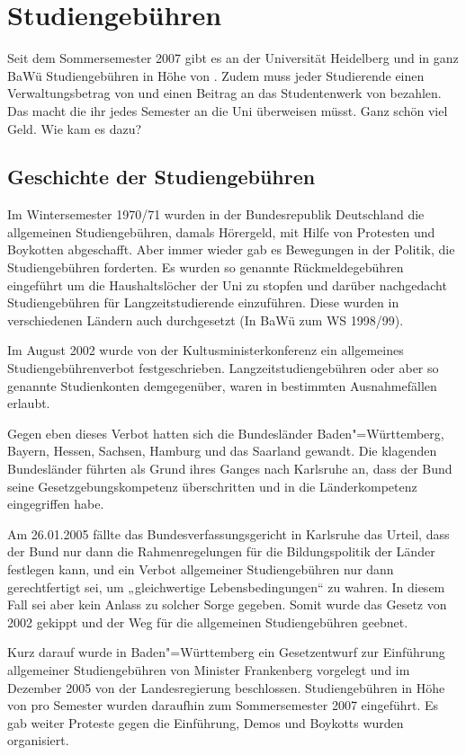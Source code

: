 \section{Studiengebühren}

Seit dem Sommersemester 2007 gibt es an der Universität Heidelberg und in ganz BaWü
Studiengebühren in Höhe von \EUR{\studiengebuehren}. Zudem muss jeder Studierende einen
Verwaltungsbetrag von \EUR{\verwaltungsbetrag} und einen Beitrag an das Studentenwerk von \EUR{\studentenwerksbeitrag}
bezahlen. Das macht \EUR{\beitragssumme} die ihr jedes Semester an die Uni überweisen müsst.
Ganz schön viel Geld. Wie kam es dazu?

\subsection*{Geschichte der Studiengebühren}

Im Wintersemester 1970/71 wurden in der Bundesrepublik Deutschland die allgemeinen
Studiengebühren, damals Hörergeld, mit Hilfe von Protesten und Boykotten abgeschafft.
Aber immer wieder gab es Bewegungen in der Politik, die Studiengebühren forderten.
Es wurden so genannte Rückmeldegebühren eingeführt um die Haushaltslöcher der Uni zu
stopfen und darüber nachgedacht Studiengebühren für Langzeitstudierende einzuführen.
Diese wurden in verschiedenen Ländern auch durchgesetzt (In BaWü zum WS 1998/99).

Im August 2002 wurde von der Kultusministerkonferenz ein allgemeines
Studiengebührenverbot festgeschrieben. Langzeitstudiengebühren oder aber so genannte
Studienkonten demgegenüber, waren in bestimmten Ausnahmefällen erlaubt.

Gegen eben dieses Verbot hatten sich die Bundesländer Baden"=Württemberg, Bayern,
Hessen, Sachsen, Hamburg und das Saarland gewandt. Die klagenden Bundesländer
führten als Grund ihres Ganges nach Karlsruhe an, dass der Bund seine
Gesetzgebungskompetenz überschritten und in die Länderkompetenz eingegriffen habe.

Am 26.01.2005 fällte das Bundesverfassungsgericht in Karlsruhe das Urteil, dass der
Bund nur dann die Rahmenregelungen für die Bildungspolitik der Länder festlegen
kann, und ein Verbot allgemeiner Studiengebühren nur dann gerechtfertigt sei, um
„gleichwertige Lebensbedingungen“ zu wahren. In diesem Fall sei aber
kein Anlass zu solcher Sorge gegeben.  Somit wurde das Gesetz von 2002 gekippt und
der Weg für die allgemeinen Studiengebühren geebnet.

Kurz darauf wurde in Baden"=Württemberg ein Gesetzentwurf zur Einführung allgemeiner
Studiengebühren von Minister Frankenberg vorgelegt und im Dezember 2005 von der
Landesregierung beschlossen.  Studiengebühren in Höhe von  pro Semester
wurden daraufhin zum Sommersemester 2007 eingeführt. Es gab weiter Proteste gegen
die Einführung, Demos und Boykotts wurden organisiert.

